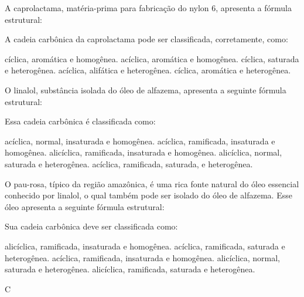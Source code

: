 \documentclass[10pt]{scrartcl}
\begin{document}
\begin{exercise}[points=1.0]
A caprolactama, matéria-prima para fabricação do nylon 6, apresenta a fórmula estrutural:
\begin{center}
\end{center}
A cadeia carbônica da caprolactama pode ser classificada, corretamente, como:
\begin{choice}
\choice cíclica, aromática e homogênea.
\choice acíclica, aromática e homogênea.
\choice cíclica, saturada e heterogênea.
\choice acíclica, alifática e heterogênea.
\choice cíclica, aromática e heterogênea.
\end{choice}
\end{exercise}



\begin{exercise}[points=1.0]
O linalol, substância isolada do óleo de alfazema, apresenta a seguinte fórmula estrutural:
\begin{center}
\end{center}
Essa cadeia carbônica é classificada como:
\begin{choice}
\choice acíclica, normal, insaturada e homogênea.
\choice acíclica, ramificada, insaturada e homogênea.
\choice alicíclica, ramificada, insaturada e homogênea.
\choice alicíclica, normal, saturada e heterogênea.
\choice acíclica, ramificada, saturada, e heterogênea.
\end{choice}
\end{exercise}






\begin{exercise}[points=1.0]
O pau-rosa, típico da região amazônica, é uma rica fonte natural do óleo essencial conhecido por linalol, o qual também pode ser isolado do óleo de alfazema. Esse óleo apresenta a seguinte fórmula estrutural:

\begin{center}
\end{center}

Sua cadeia carbônica deve ser classificada como:
\begin{choice}
\choice alicíclica, ramificada, insaturada e homogênea.
\choice acíclica, ramificada, saturada e heterogênea.
\choice acíclica, ramificada, insaturada e homogênea.
\choice alicíclica, normal, saturada e heterogênea.
\choice alicíclica, ramificada, saturada e heterogênea.
\end{choice}
\end{exercise}
\begin{solution}
C
\end{solution}
\end{document}

